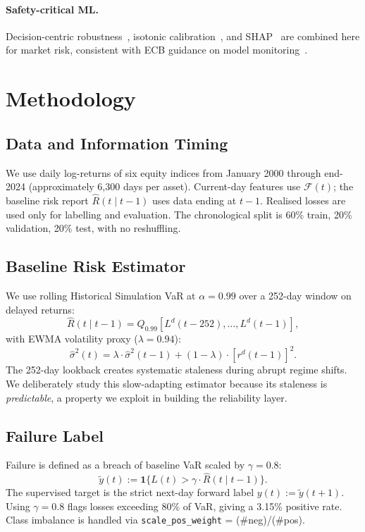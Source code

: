 \documentclass[sigconf]{acmart}
\begin{document}
\paragraph{Safety-critical ML.}
Decision-centric robustness~\cite{chow2022decision}, isotonic
calibration~\cite{zadrozny2002transforming}, and
SHAP~\cite{lundberg2017unified} are combined here for market risk,
consistent with ECB guidance on model monitoring~\cite{ecb2024guide}.

\section{Methodology}
\label{sec:method}

\subsection{Data and Information Timing}
We use daily log-returns of six equity indices from January 2000 through end-2024 (approximately 6,300 days per asset). Current-day features use $\mathcal{F}(t)$; the baseline risk report $\hat{R}(t \mid t - 1)$ uses data ending at $t-1$. Realised losses are used only for labelling and evaluation. The chronological split is 60\% train, 20\% validation, 20\% test, with no reshuffling.

\subsection{Baseline Risk Estimator}
We use rolling Historical Simulation VaR at $\alpha = 0.99$ over a 252-day window on delayed returns:
\begin{equation}
\hat{R}(t \mid t - 1) = Q_{0.99} [L^d(t - 252), \dots, L^d(t - 1)],
\end{equation}
with EWMA volatility proxy ($\lambda = 0.94$):
\begin{equation}
\hat{\sigma}^2(t) = \lambda \cdot \hat{\sigma}^2(t - 1) + (1 - \lambda) \cdot [r^d(t - 1)]^2.
\end{equation}
The 252-day lookback creates systematic staleness during abrupt regime shifts. We deliberately study this slow-adapting estimator because its staleness is \textit{predictable}, a property we exploit in building the reliability layer.

\subsection{Failure Label}
Failure is defined as a breach of baseline VaR scaled by $\gamma = 0.8$:
\begin{equation}
\tilde{y}(t) := \mathbf{1} \{ L(t) > \gamma \cdot \hat{R}(t \mid t - 1) \}.
\end{equation}
The supervised target is the strict next-day forward label $y(t) := \tilde{y}(t + 1)$. Using $\gamma = 0.8$ flags losses exceeding 80\% of VaR, giving a 3.15\% positive rate. Class imbalance is handled via \texttt{scale\_pos\_weight} = (\#neg)/(\#pos).
\end{document}
